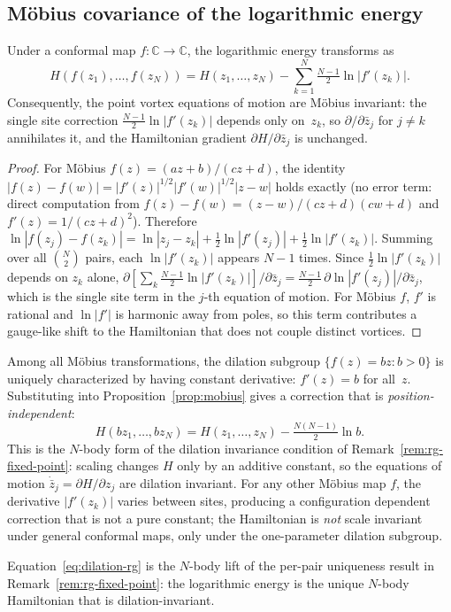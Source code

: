 \subsection{M\"obius covariance of the logarithmic energy}
\label{sec:mobius-cov}

\begin{proposition}\label{prop:mobius}
Under a conformal map $f\colon\mathbb{C}\to\mathbb{C}$, the
logarithmic energy transforms as
\[
  H(f(z_1),\dots,f(z_N))
  = H(z_1,\dots,z_N) - \sum_{k=1}^{N}\tfrac{N-1}{2}\ln|f'(z_k)|.
\]
Consequently, the point vortex equations of motion are
M\"obius invariant: the single site correction
$\tfrac{N-1}{2}\ln|f'(z_k)|$ depends only on~$z_k$, so
$\partial/\partial \bar z_j$ for $j \ne k$ annihilates it, and the
Hamiltonian gradient $\partial H/\partial \bar z_j$ is unchanged.
\end{proposition}
\begin{proof}
For M\"obius $f(z) = (az{+}b)/(cz{+}d)$, the identity
$|f(z){-}f(w)| = |f'(z)|^{1/2}|f'(w)|^{1/2}|z{-}w|$
holds exactly (no error term: direct computation from
$f(z){-}f(w) = (z{-}w)/(cz{+}d)(cw{+}d)$ and
$f'(z) = 1/(cz{+}d)^2$).
Therefore $\ln|f(z_j){-}f(z_k)| = \ln|z_j{-}z_k|
+ \tfrac12\ln|f'(z_j)| + \tfrac12\ln|f'(z_k)|$.  Summing over
all $\binom{N}{2}$ pairs, each $\ln|f'(z_k)|$ appears $N{-}1$
times.  Since $\tfrac12\ln|f'(z_k)|$ depends on $z_k$ alone,
$\partial[\sum_k\tfrac{N-1}{2}\ln|f'(z_k)|]/\partial\bar z_j
= \tfrac{N-1}{2}\,\partial\ln|f'(z_j)|/\partial\bar z_j$,
which is the single site term in the $j$-th equation of motion.
For M\"obius $f$, $f'$ is rational and $\ln|f'|$ is harmonic away
from poles, so this term contributes a gauge-like shift to the
Hamiltonian that does not couple distinct vortices.
\end{proof}

\begin{corollary}[Dilation subgroup = scale invariant Hamiltonian]
\label{cor:dilation-rg}
Among all M\"obius transformations, the dilation subgroup
$\{f(z) = bz : b > 0\}$ is uniquely characterized by having
constant derivative: $f'(z) = b$ for all~$z$.  Substituting
into Proposition~\ref{prop:mobius} gives a correction that is
\emph{position-independent}:
\begin{equation}\label{eq:dilation-rg}
  H(bz_1,\dots,bz_N)
  = H(z_1,\dots,z_N) - \tfrac{N(N-1)}{2}\ln b.
\end{equation}
This is the $N$-body form of the dilation invariance condition of
Remark~\ref{rem:rg-fixed-point}: scaling changes $H$ only by an
additive constant, so the equations of motion
$\dot{\bar z}_j = \partial H/\partial z_j$ are dilation invariant.
For any other M\"obius map $f$, the derivative $|f'(z_k)|$ varies
between sites, producing a configuration dependent correction that
is not a pure constant; the Hamiltonian is \emph{not}
scale invariant under general conformal maps, only under the
one-parameter dilation subgroup.

Equation~\eqref{eq:dilation-rg} is the $N$-body lift of the per-pair
uniqueness result in Remark~\ref{rem:rg-fixed-point}: the logarithmic
energy is the unique $N$-body Hamiltonian that is dilation-invariant.
\end{corollary}

